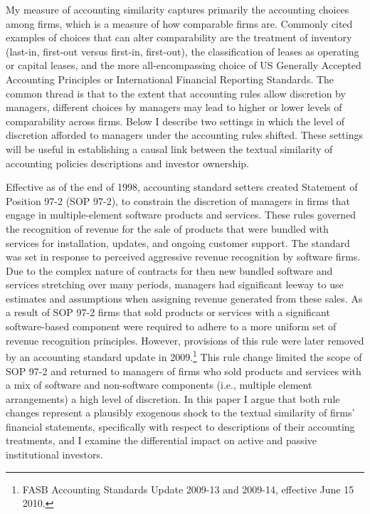\documentclass[thesis]{thesis-umich}
\begin{document}
My measure of accounting similarity captures primarily the accounting choices among firms, which is a measure of how comparable firms are. Commonly cited examples of choices that can alter comparability are the treatment of inventory (last-in, first-out versus first-in, first-out), the classification of leases as operating or capital leases, and the more all-encompassing choice of US Generally Accepted Accounting Principles or International Financial Reporting Standards. The common thread is that to the extent that accounting rules allow discretion by managers, different choices by managers may lead to higher or lower levels of comparability across firms. Below I describe two settings in which the level of discretion afforded to managers under the accounting rules shifted. These settings will be useful in establishing a causal link between the textual similarity of accounting policies descriptions and investor ownership.

Effective as of the end of 1998, accounting standard setters created Statement of Position 97-2 (\ac{SOP 97-2}), to constrain the discretion of managers in firms that engage in multiple-element software products and services. These rules governed the recognition of revenue for the sale of products that were bundled with services for installation, updates, and ongoing customer support. The standard was set in response to perceived aggressive revenue recognition by software firms. Due to the complex nature of contracts for then new bundled software and services stretching over many periods, managers had significant leeway to use estimates and assumptions when assigning revenue generated from these sales. As a result of SOP 97-2 firms that sold products or services with a significant software-based component were required to adhere to a more uniform set of revenue recognition principles. However, provisions of this rule were later removed by an accounting standard update in 2009.\footnote{FASB Accounting Standards Update 2009-13 and 2009-14, effective June 15 2010.} This rule change limited the scope of SOP 97-2 and returned to managers of firms who sold products and services with a mix of software and non-software components (i.e., multiple element arrangements) a high level of discretion. In this paper I argue that both rule changes represent a plausibly exogenous shock to the textual similarity of firms' financial statements, specifically with respect to descriptions of their accounting treatments, and I examine the differential impact on active and passive institutional investors. 
\end{document}

